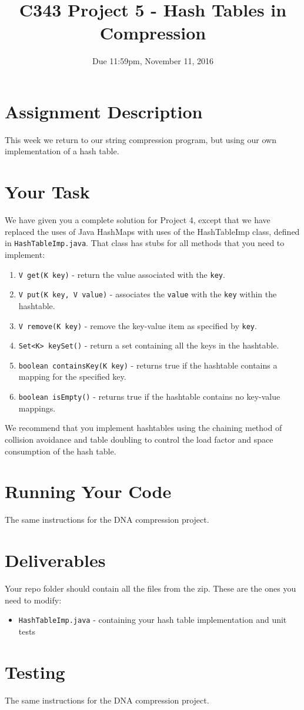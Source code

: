 \documentclass[12pt]{article}
\title{C343 Project 5 - Hash Tables in Compression}
\date{Due 11:59pm, November 11, 2016}
\begin{document}
\maketitle

\section{Assignment Description}

This week we return to our string compression program, but using our own
implementation of a hash table.


\section{Your Task}

We have given you a complete solution for Project 4, except that we have
replaced the uses of Java HashMaps with uses of the HashTableImp class,
defined in \lstinline{HashTableImp.java}. That class has stubs for all
methods that you need to implement:
\begin{enumerate}
\item \lstinline{V get(K key)} - return the value associated with the \lstinline{key}.
\item \lstinline{V put(K key, V value)} - associates the \lstinline{value} with the \lstinline{key} within the hashtable.
\item \lstinline{V remove(K key)} - remove the key-value item as specified by \lstinline{key}.
\item \lstinline{Set<K> keySet()} - return a set containing all the keys
  in the hashtable.
\item \lstinline{boolean containsKey(K key)} - returns true if the
  hashtable contains a mapping for the specified key.
\item \lstinline{boolean isEmpty()} - returns true if the hashtable contains no key-value mappings.
\end{enumerate}

We recommend that you implement hashtables using the chaining method
of collision avoidance and table doubling to control the load factor
and space consumption of the hash table.

\section{Running Your Code}
The same instructions for the DNA compression project.

\section{Deliverables}

Your repo folder should contain all the files from the zip.  These are
the ones you need to modify:
\begin{itemize}
\item \lstinline{HashTableImp.java} - containing your hash table implementation and unit tests
\end{itemize}

\section{Testing}
The same instructions for the DNA compression project.
\end{document}
